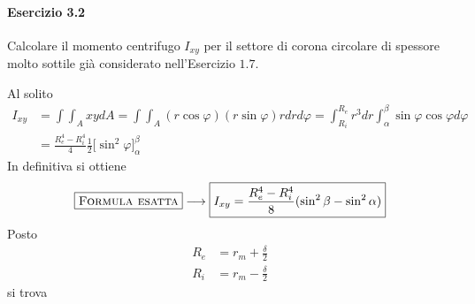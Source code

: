 \paragraph{Esercizio 3.2}
Calcolare il momento centrifugo $I_{xy}$ per il settore di corona circolare di spessore molto sottile già considerato nell'Esercizio $1.7$.
\newline 

\noindent Al solito 
\begin{align*}
I_{xy} &= \int\int_A xydA = \int\int_A (r\cos\varphi)(r\sin\varphi)rdrd\varphi = \int_{R_i}^{R_e}r^{3}dr\int_{\alpha}^{\beta} \sin\varphi\cos\varphi d\varphi \\
          &= \frac{R_{e}^{4}-R_{i}^{4}}{4}\frac{1}{2}\bigl[\sin^{2}\varphi\bigr]_{\alpha}^{\beta}
\end{align*}
In definitiva si ottiene 
\begin{equation*}
\boxed{\textup{\textsc{Formula esatta}}} \longrightarrow \boxed{I_{xy} = \frac{R_{e}^{4}-R_{i}^{4}}{8}(\sin^{2}\beta-\sin^{2}\alpha)}
\end{equation*}
Posto
\begin{align*}
R_e &= r_m + \frac{\delta}{2} \\
R_i  &= r_m - \frac{\delta}{2}
\end{align*}
si trova 
